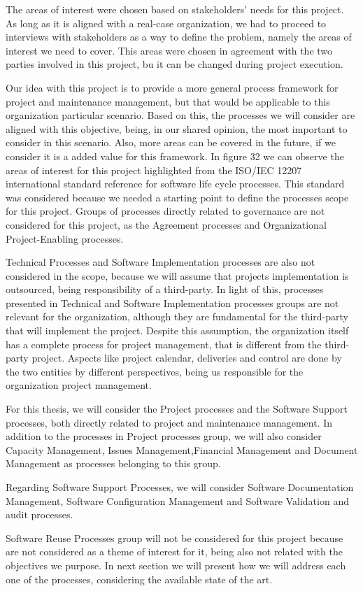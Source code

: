 The areas of interest were chosen based on stakeholders' needs for this project. As long as it is aligned with a real-case organization, we had to proceed to interviews with stakeholders as a way to define the problem, namely the areas of interest we need to cover. This areas were chosen in agreement with the two parties involved in this project, bu it can be changed during project execution.\par
Our idea with this project is to provide a more general process framework for project and maintenance management, but that would be applicable to this organization particular scenario. Based on this, the processes we will consider are aligned with this objective, being, in our shared opinion, the most important to consider in this scenario. Also, more areas can be covered in the future, if we consider it is a added value for this framework.  
In figure 32 we can observe the areas of interest for this project highlighted from the ISO/IEC 12207 international standard reference for software life cycle processes. This standard was considered because we needed a starting point to define the processes scope for this project. Groups of processes directly related to governance are not considered for this project, as the Agreement processes and Organizational Project-Enabling processes.\par
Technical Processes and Software Implementation processes are also not considered in the scope, because we will assume that projects implementation is outsourced, being responsibility of a third-party. In light of this, processes presented in Technical and Software Implementation processes groups are not relevant for the organization, although  they are fundamental for the third-party that will implement the project. Despite this assumption, the organization itself has a complete process for project management, that is different from the third-party project. Aspects like project calendar, deliveries and control are done by the two entities by different perspectives, being us responsible for the organization project management.\par
For this thesis, we will consider the Project processes and the Software Support processes, both directly related to project and maintenance management. In addition to the processes in Project processes group, we will also consider Capacity Management, Issues Management,Financial Management and Document Management as processes belonging to this group.\par
Regarding Software Support Processes, we will consider Software Documentation Management, Software Configuration Management and Software Validation and audit processes.\par
Software Reuse Processes group will not be considered for this project because are not considered as a theme of interest for it, being also not related with the objectives we purpose. In next section we will present how we will address each one of the processes, considering the available state of the art.\par

